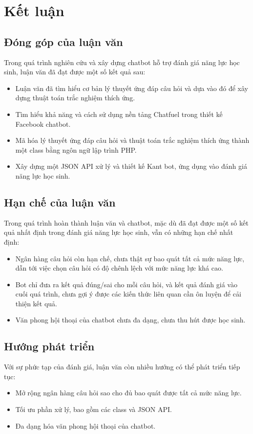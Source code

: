\chapter*{Kết luận}

\section*{Đóng góp của luận văn}
Trong quá trình nghiên cứu và xây dựng chatbot hỗ trợ đánh giá năng lực học sinh, luận văn đã đạt được một số kết quả sau: \begin{itemize}
	\item Luận văn đã tìm hiểu cơ bản lý thuyết ứng đáp câu hỏi và dựa vào đó để xây dựng thuật toán trắc nghiệm thích ứng.
	\item Tìm hiểu khả năng và cách sử dụng nền tảng Chatfuel trong thiết kế Facebook chatbot.
	\item Mã hóa lý thuyết ứng đáp câu hỏi và thuật toán trắc nghiệm thích ứng thành một class bằng ngôn ngữ lập trình PHP.
	\item Xây dựng một JSON API xử lý và thiết kế Kant bot, ứng dụng vào đánh giá năng lực học sinh.
\end{itemize}

\section*{Hạn chế của luận văn}
Trong quá trình hoàn thành luận văn và chatbot, mặc dù đã đạt được một số kết quả nhất định trong đánh giá năng lực học sinh, vẫn có những hạn chế nhất định: \begin{itemize}
	\item Ngân hàng câu hỏi còn hạn chế, chưa thật sự bao quát tất cả mức năng lực, dẫn tới việc chọn câu hỏi có độ chênh lệch với mức năng lực khá cao.
	\item Bot chỉ đưa ra kết quả đúng/sai cho mỗi câu hỏi, và kết quả đánh giá vào cuối quá trình, chưa gợi ý được các kiến thức liên quan cần ôn luyện để cải thiện kết quả.
	\item Văn phong hội thoại của chatbot chưa đa dạng, chưa thu hút được học sinh.
\end{itemize}

\section*{Hướng phát triển}
Với sự phức tạp của đánh giá, luận văn còn nhiều hướng có thể phát triển tiếp tục: \begin{itemize}
	\item Mở rộng ngân hàng câu hỏi sao cho đủ bao quát được tất cả mức năng lực.
	\item Tối ưu phần xử lý, bao gồm các class và JSON API.
	\item Đa dạng hóa văn phong hội thoại của chatbot.
\end{itemize}
